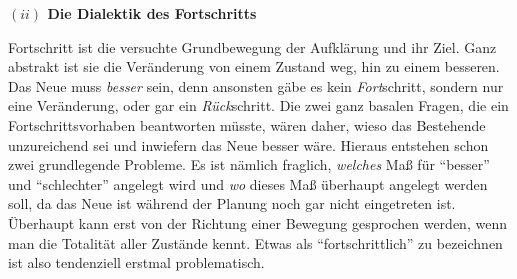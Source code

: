 \documentclass[a4paper, 12pt]{article}
\begin{document}
\begin{onehalfspace}
\vspace{5mm}
\noindent\textbf{$(ii)$ Die Dialektik des Fortschritts}

\noindent Fortschritt ist die versuchte Grundbewegung der Aufklärung und ihr Ziel. Ganz abstrakt ist sie die Veränderung von einem Zustand weg, hin zu einem besseren. Das Neue muss \emph{besser} sein, denn ansonsten gäbe es kein \emph{Fort}schritt, sondern nur eine Veränderung, oder gar ein \emph{Rück}schritt. Die zwei ganz basalen Fragen, die ein Fortschrittsvorhaben beantworten müsste, wären daher, wieso das Bestehende unzureichend sei und inwiefern das Neue besser wäre. Hieraus entstehen schon zwei grundlegende Probleme. Es ist nämlich fraglich, \emph{welches} Maß für "`besser"' und "`schlechter"' angelegt wird und \emph{wo} dieses Maß überhaupt angelegt werden soll, da das Neue ist während der Planung noch gar nicht eingetreten ist. Überhaupt kann erst von der Richtung einer Bewegung gesprochen werden, wenn man die Totalität aller Zustände kennt. Etwas als "`fortschrittlich"' zu bezeichnen ist also tendenziell erstmal problematisch. 


\end{onehalfspace}
\end{document}
